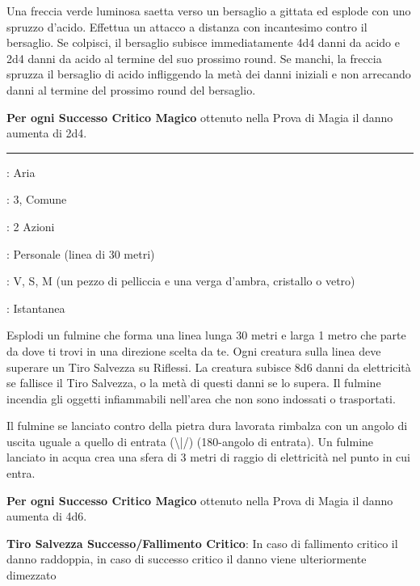 \begin{multicols}{2}
Una freccia verde luminosa saetta verso un bersaglio a gittata ed esplode con uno spruzzo d'acido. Effettua un attacco a distanza con incantesimo contro il bersaglio. Se colpisci, il bersaglio subisce immediatamente 4d4 danni da acido e 2d4 danni da acido al termine del suo prossimo round. Se manchi, la freccia spruzza il bersaglio di acido infliggendo la metà dei danni iniziali e non arrecando danni al termine del prossimo round del bersaglio.

\textbf{Per ogni Successo Critico Magico} ottenuto nella Prova di Magia il danno aumenta di 2d4.

\smallskip\noindent\rule{\linewidth}{2pt} \hypertarget{Fulmine}{}\medskip{}
\noindent
\begin{description}[noitemsep, topsep=0pt, parsep=0pt, partopsep=0pt, leftmargin=0cm, labelwidth=2.8cm]
	\item[\textbf{Lista di Magia}]: Aria
	\item[\textbf{Livello}]: 3, Comune
	\item[\textbf{T. di Lancio}]: 2 Azioni
	\item[\textbf{Gittata}]: Personale (linea di 30 metri)
	\item[\textbf{Componenti}]: V, S, M (un pezzo di pelliccia e una verga d'ambra, cristallo o vetro)
	\item[\textbf{Durata}]: Istantanea
\end{description}

Esplodi un fulmine che forma una linea lunga 30 metri e larga 1 metro che parte da dove ti trovi in una direzione scelta da te. Ogni creatura sulla linea deve superare un Tiro Salvezza su Riflessi. La creatura subisce 8d6 danni da elettricità se fallisce il Tiro Salvezza, o la metà di questi danni se lo supera.
Il fulmine incendia gli oggetti infiammabili nell'area che non sono indossati o trasportati.

Il fulmine se lanciato contro della pietra dura lavorata rimbalza con un angolo di uscita uguale a quello di entrata (\textbackslash|/) (180-angolo di entrata). Un fulmine lanciato in acqua crea una sfera di 3 metri di raggio di elettricità nel punto in cui entra.

\textbf{Per ogni Successo Critico Magico} ottenuto nella Prova di Magia il danno aumenta di 4d6.

\textbf{Tiro Salvezza Successo/Fallimento Critico}: In caso di fallimento critico il danno raddoppia, in caso di successo critico il danno viene ulteriormente dimezzato


\end{multicols}
